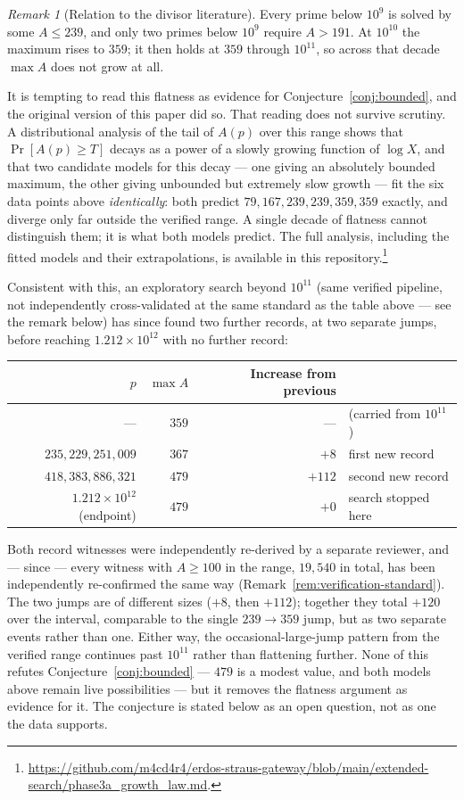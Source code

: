\documentclass[12pt]{amsart}
\theoremstyle{definition}
\theoremstyle{remark}
\newtheorem{remark}[theorem]{Remark}
\begin{document}
\begin{remark}[Relation to the divisor literature]
Every prime below $10^9$ is solved by some $A \leq 239$, and only two
primes below $10^9$ require $A > 191$.
At $10^{10}$ the maximum rises to $359$; it then holds at $359$ through
$10^{11}$, so across that decade $\max A$ does not grow at all.

It is tempting to read this flatness as evidence for
Conjecture~\ref{conj:bounded}, and the original version of this paper
did so. That reading does not survive scrutiny. A distributional
analysis of the tail of $A(p)$ over this range shows that
$\Pr[A(p) \geq T]$ decays as a power of a slowly growing function of
$\log X$, and that two candidate models for this decay --- one giving
an absolutely bounded maximum, the other giving unbounded but
extremely slow growth --- fit the six data points above
\emph{identically}: both predict $79, 167, 239, 239, 359, 359$ exactly,
and diverge only far outside the verified range. A single decade of
flatness cannot distinguish them; it is what both models predict.
The full analysis, including the fitted models and their
extrapolations, is available in this repository.\footnote{
\url{https://github.com/m4cd4r4/erdos-straus-gateway/blob/main/extended-search/phase3a_growth_law.md}.}

Consistent with this, an exploratory search beyond $10^{11}$ (same
verified pipeline, not independently cross-validated at the same
standard as the table above --- see the remark below) has since found
two further records, at two separate jumps, before reaching
$1.212 \times 10^{12}$ with no further record:
\begin{center}
\begin{tabular}{@{}rrrl@{}}
\toprule
$p$ & $\max A$ & Increase from previous & \\
\midrule
--- & $359$ & --- & (carried from $10^{11}$) \\
$235{,}229{,}251{,}009$ & $367$ & $+8$ & first new record \\
$418{,}383{,}886{,}321$ & $479$ & $+112$ & second new record \\
$1.212 \times 10^{12}$ (endpoint) & $479$ & $+0$ & search stopped here \\
\bottomrule
\end{tabular}
\end{center}
Both record witnesses were independently re-derived by a separate
reviewer, and --- since --- every witness with $A \geq 100$ in the
range, $19{,}540$ in total, has been independently re-confirmed the
same way (Remark~\ref{rem:verification-standard}). The
two jumps are of different sizes ($+8$, then $+112$); together they
total $+120$ over the interval, comparable to the single $239 \to 359$
jump, but as two separate events rather than one. Either way, the
occasional-large-jump pattern from the verified range continues past
$10^{11}$ rather than flattening further.
None of this refutes Conjecture~\ref{conj:bounded} --- $479$ is a
modest value, and both models above remain live possibilities --- but
it removes the flatness argument as evidence for it. The conjecture
is stated below as an open question, not as one the data supports.


\end{remark}
\end{document}
